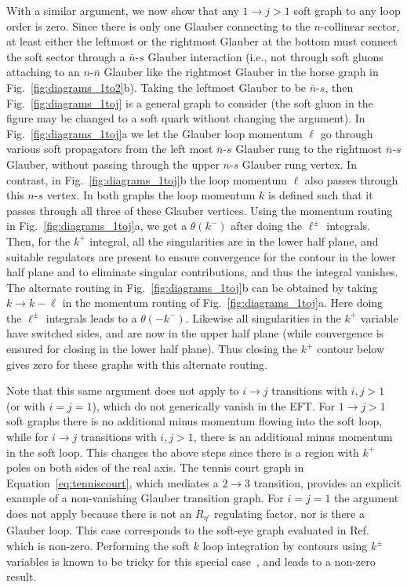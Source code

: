 \documentclass[letterpaper,11pt]{article}
\newcommand{\fig}[1]{Fig.~\ref{fig:#1}}
\newcommand{\Eq}[1]{Equation~\eqref{#1}}
\DeclareRobustCommand{\Eq}[1]{Eq.~(\ref{#1})}
\newcommand{\bn}{{\bar n}}
\begin{document}
With a similar argument, we now show that any $1\to j >1$ soft graph to any loop order is zero.
Since there is only one Glauber connecting to the $n$-collinear sector, 
at least either the leftmost or the rightmost Glauber at the bottom must connect the soft sector through a $\bn$-$s$ Glauber interaction (i.e., not through soft gluons attaching to an $n$-$\bn$ Glauber like the rightmost Glauber in the horse graph in \fig{diagrams_1to2}b). Taking the leftmost 
Glauber to be $\bn$-$s$, then \fig{diagrams_1toj} is a general graph to consider (the soft gluon in the figure may be changed to a soft quark without changing the argument).  In \fig{diagrams_1toj}a we let the Glauber loop momentum $\ell$ go through various soft propagators from the left most $\bn$-$s$ Glauber rung to the rightmost $\bn$-$s$ Glauber, without passing through the upper $n$-$s$ Glauber rung vertex. In contrast, in \fig{diagrams_1toj}b the loop momentum $\ell$ also passes through this $n$-$s$ vertex.  In both graphs the loop momentum $k$ is defined such that it passes through all three of these Glauber vertices. 
Using the momentum routing in \fig{diagrams_1toj}a, we get a $\theta(k^-)$ after doing the $\ell^\pm$ integrals. Then, for the $k^+$ integral, all the singularities are in the lower half plane, and suitable regulators are present to ensure convergence for the contour in the lower half plane and to eliminate singular contributions, and thus the integral vanishes.   The alternate routing in \fig{diagrams_1toj}b can be obtained by taking $k\to k-\ell$ in the momentum routing of \fig{diagrams_1toj}a.
Here doing the $\ell^\pm$ integrals leads to a $\theta(-k^-)$.  Likewise all singularities in the $k^+$ variable have switched sides, and are now in the upper half plane (while convergence is ensured for closing in the lower half plane). Thus closing the $k^+$ contour below gives zero for these graphs with this alternate routing. 


Note that this same argument does not apply to $i \to j$ transitions with $i,j >1$ (or with $i=j=1$), which do not generically vanish in the EFT. For $1\to j>1$ soft graphs there is no additional minus momentum flowing into the soft loop, while for $i \to j$ transitions with $i,j >1$, there is an additional minus momentum in the soft loop.  This changes the above steps since there is a region with $k^+$ poles on both sides of the real axis.
The tennis court graph in \Eq{eq:tenniscourt}, which mediates a $2\to 3$ transition, provides an explicit example of a non-vanishing Glauber transition graph.  For $i=j=1$ the argument does not apply because there is not an $R_{\eta'}$ regulating factor, nor is there a Glauber loop. This case corresponds to the soft-eye graph evaluated in Ref.~\cite{Rothstein:2016bsq} which is non-zero. Performing the soft $k$ loop integration by contours using $k^\pm$ variables is known to be tricky for this special case~\cite{Collins:2018aqt}, and leads to a non-zero result.
\end{document}
